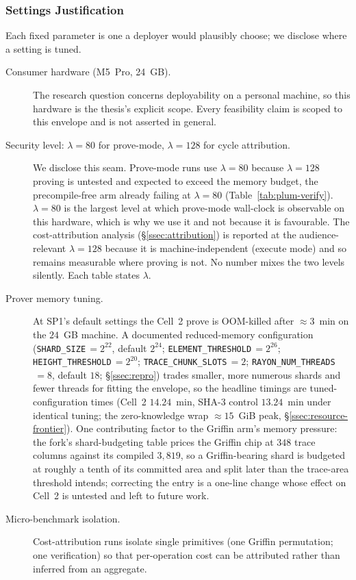\subsubsection{Settings Justification}\label{ssec:settings-justify}
Each fixed parameter is one a deployer would plausibly choose; we disclose where a setting is tuned.

\begin{description}
  \item[Consumer hardware (M5~Pro, 24~GB).] The research question concerns deployability on a personal machine, so this hardware is the thesis's explicit scope. Every feasibility claim is scoped to this envelope and is not asserted in general.
  \item[Security level: $\lambda=80$ for prove-mode, $\lambda=128$ for cycle attribution.] We disclose this seam. Prove-mode runs use $\lambda=80$ because $\lambda=128$ proving is untested and expected to exceed the memory budget, the precompile-free arm already failing at $\lambda=80$ (Table~\ref{tab:plum-verify}). $\lambda=80$ is the largest level at which prove-mode wall-clock is observable on this hardware, which is why we use it and not because it is favourable. The cost-attribution analysis (\S\ref{ssec:attribution}) is reported at the audience-relevant $\lambda=128$ because it is machine-independent (execute mode) and so remains measurable where proving is not. No number mixes the two levels silently. Each table states $\lambda$.
  \item[Prover memory tuning.] At SP1's default settings the Cell~2 prove is OOM-killed after ${\approx}3$~min on the $24$~GB machine. A documented reduced-memory configuration (\texttt{SHARD\_SIZE}$\,=2^{22}$, default $2^{24}$; \texttt{ELEMENT\_THRESHOLD}$\,=2^{26}$; \texttt{HEIGHT\_THRESHOLD}$\,=2^{20}$; \texttt{TRACE\_CHUNK\_SLOTS}$\,=2$; \texttt{RAYON\_NUM\_THREADS}$\,=8$, default $18$; \S\ref{ssec:repro}) trades smaller, more numerous shards and fewer threads for fitting the envelope, so the headline timings are tuned-configuration times (Cell~2 $14.24$~min, SHA-3 control $13.24$~min under identical tuning; the zero-knowledge wrap ${\approx}15$~GiB peak, \S\ref{ssec:resource-frontier}). One contributing factor to the Griffin arm's memory pressure: the fork's shard-budgeting table prices the Griffin chip at $348$ trace columns against its compiled $3{,}819$, so a Griffin-bearing shard is budgeted at roughly a tenth of its committed area and split later than the trace-area threshold intends; correcting the entry is a one-line change whose effect on Cell~2 is untested and left to future work.
  \item[Micro-benchmark isolation.] Cost-attribution runs isolate single primitives (one Griffin permutation; one verification) so that per-operation cost can be attributed rather than inferred from an aggregate.
\end{description}

